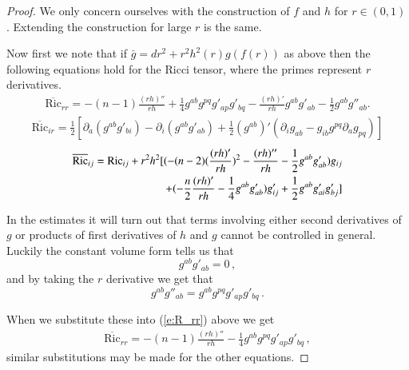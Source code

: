 \documentclass[11pt]{article}
\newcommand{\Ric}{\text{Ric}}
\begin{document}
\begin{proof}
We only concern ourselves with the construction of $f$ and $h$ for $r\in (0,1)$.  Extending the construction for large $r$ is the same.

Now first we note that if $\bar{g}=dr^{2}+r^{2}h^{2}(r)g(f(r))$ as above then the following equations hold for the Ricci tensor, where the primes represent $r$ derivatives.
\begin{align}\label{e:R_rr}
 \overline{\Ric}_{rr} = -(n-1)\frac{(rh)''}{rh}+\frac{1}{4}g^{ab}g^{pq}g'_{ap}g'_{bq} -\frac{(rh)'}{rh}g^{ab}g'_{ab}-\frac{1}{2}g^{ab}g''_{ab}.
\end{align}
\begin{align}
 \overline{\Ric}_{ir} = \frac{1}{2}[\partial_{a}(g^{ab}g'_{bi}) - \partial_{i}(g^{ab}g'_{ab}) + \frac{1}{2}(g^{ab})'(\partial_{i}g_{ab} - g_{ib}g^{pq}\partial_{a}g_{pq})]
\end{align}
\begin{align}
\overline{\Ric}_{ij} = \Ric_{ij} + r^{2}h^{2}[(-(n-2)(\frac{(rh)'}{rh})^{2} -\frac{(rh)''}{rh}- \frac{1}{2}g^{ab}g'_{ab})g_{ij} \notag
\\
+(-\frac{n}{2}\frac{(rh)'}{rh} -\frac{1}{4}g^{ab}g'_{ab})g'_{ij} +\frac{1}{2}g^{ab}g'_{ai}g'_{bj}]
\end{align}

In the estimates it will turn out that terms involving either second derivatives of $g$ or products of first derivatives of $h$ and $g$ cannot be controlled in general.  Luckily the constant volume form tells us that
$$g^{ab}g'_{ab}=0\, ,$$
and by taking the $r$ derivative we get that
$$g^{ab}g''_{ab} = g^{ab}g^{pq}g'_{ap}g'_{bq}\, .$$

When we substitute these into (\ref{e:R_rr}) above we get
\begin{align}
\overline{\Ric}_{rr} = -(n-1)\frac{(rh)''}{rh} -\frac{1}{4} g^{ab}g^{pq}g'_{ap}g'_{bq}\, ,
\end{align}
similar substitutions may be made for the other equations.


\end{proof}
\end{document}

